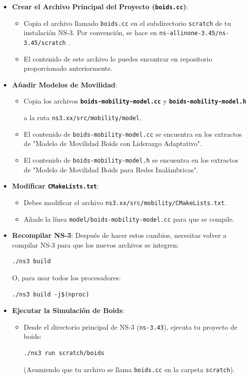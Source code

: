 \documentclass{article}
\begin{document}
\begin{itemize}
    \item \textbf{Crear el Archivo Principal del Proyecto (\texttt{boids.cc})}:
    \begin{itemize}
        \item Copia el archivo llamado \texttt{boids.cc} en el subdirectorio \texttt{scratch} de tu instalación NS-3. Por convención, se hace en \texttt{ns-allinone-3.45/ns-3.45/scratch} .
        \item El contenido de este archivo lo puedes encontrar en repositorio proporcionado anteriormente.
    \end{itemize}
    \item \textbf{Añadir Modelos de Movilidad}:
    \begin{itemize}
        \item Copia los archivos \textbf{\texttt{boids-mobility-model.cc}} y
            \textbf{\texttt{boids-mobility-model.h}}

            a la ruta \texttt{ns3.xx/src/mobility/model}.
        \item El contenido de \texttt{boids-mobility-model.cc} se encuentra en los extractos de "Modelo de Movilidad Boids con Liderazgo Adaptativo".
        \item El contenido de \texttt{boids-mobility-model.h} se encuentra en los extractos de "Modelo de Movilidad Boids para Redes Inalámbricas".
    \end{itemize}
    \item \textbf{Modificar \texttt{CMakeLists.txt}}:
    \begin{itemize}
        \item Debes modificar el archivo \texttt{ns3.xx/src/mobility/CMakeLists.txt}.
        \item Añade la línea \texttt{model/boids-mobility-model.cc} para que se compile.
    \end{itemize}
    \item \textbf{Recompilar NS-3}: Después de hacer estos cambios, necesitas volver a compilar NS-3 para que los nuevos archivos se integren:
    \begin{lstlisting}
./ns3 build
    \end{lstlisting}
    O, para usar todos los procesadores:
    \begin{lstlisting}
./ns3 build -j$(nproc)
    \end{lstlisting}
    \item \textbf{Ejecutar la Simulación de Boids}:
    \begin{itemize}
        \item Desde el directorio principal de NS-3 (\texttt{ns-3.43}), ejecuta tu proyecto de boids:
        \begin{lstlisting}
./ns3 run scratch/boids
        \end{lstlisting}
        (Asumiendo que tu archivo se llama \texttt{boids.cc} en la carpeta \texttt{scratch}).
    \end{itemize}
\end{itemize}
\end{document}
